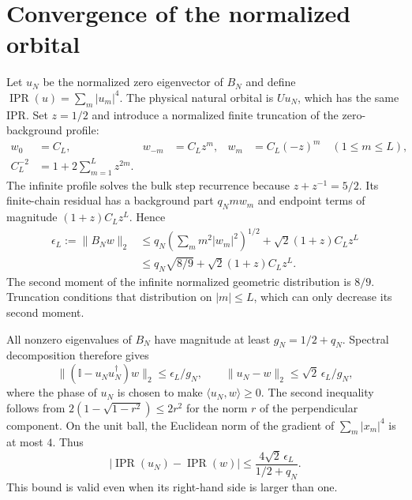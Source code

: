\documentclass[11pt,a4paper]{article}
\newcommand{\IPR}{\operatorname{IPR}}
\newcommand{\Id}{\mathbb{I}}
\begin{document}
\section{Convergence of the normalized orbital}
Let $u_N$ be the normalized zero eigenvector of $B_N$ and define
$\IPR(u)=\sum_m|u_m|^4$. The physical natural orbital is $Uu_N$,
which has the same IPR. Set $z=1/2$ and introduce a normalized
finite truncation of the zero-background profile:
\begin{align}
 w_0&=C_L,& w_{-m}&=C_Lz^m,& w_m&=C_L(-z)^m\quad(1\le m\le L),
 \label{eq:w}\\
 C_L^{-2}&=1+2\sum_{m=1}^{L}z^{2m}.
 \nonumber
\end{align}
The infinite profile solves the bulk step recurrence because
$z+z^{-1}=5/2$. Its finite-chain residual has a background part
$q_Nm w_m$ and endpoint terms of magnitude
$(1+z)C_Lz^L$. Hence
\begin{align}
 \epsilon_L:=\|B_Nw\|_2
 &\le q_N\left(\sum_m m^2|w_m|^2\right)^{1/2}
       +\sqrt2(1+z)C_Lz^L
 \label{eq:residual}\\
 &\le q_N\sqrt{8/9}+\sqrt2(1+z)C_Lz^L.
 \nonumber
\end{align}
The second moment of the infinite normalized geometric distribution
is $8/9$. Truncation conditions that distribution on $|m|\le L$,
which can only decrease its second moment.

All nonzero eigenvalues of $B_N$ have magnitude at least
$g_N=1/2+q_N$. Spectral decomposition therefore gives
\begin{equation}
 \|(\Id-u_Nu_N^\dagger)w\|_2\le\epsilon_L/g_N,
 \qquad \|u_N-w\|_2\le\sqrt2\,\epsilon_L/g_N,
 \label{eq:vectorbound}
\end{equation}
where the phase of $u_N$ is chosen to make
$\langle u_N,w\rangle\ge0$. The second inequality follows from
$2(1-\sqrt{1-r^2})\le2r^2$ for the norm $r$ of the perpendicular
component. On the unit ball, the Euclidean norm of the gradient of
$\sum_m|x_m|^4$ is at most $4$. Thus
\begin{equation}
 |\IPR(u_N)-\IPR(w)|\le
       \frac{4\sqrt2\,\epsilon_L}{1/2+q_N}.
 \label{eq:iprbound}
\end{equation}
This bound is valid even when its right-hand side is larger than one.
\end{document}
